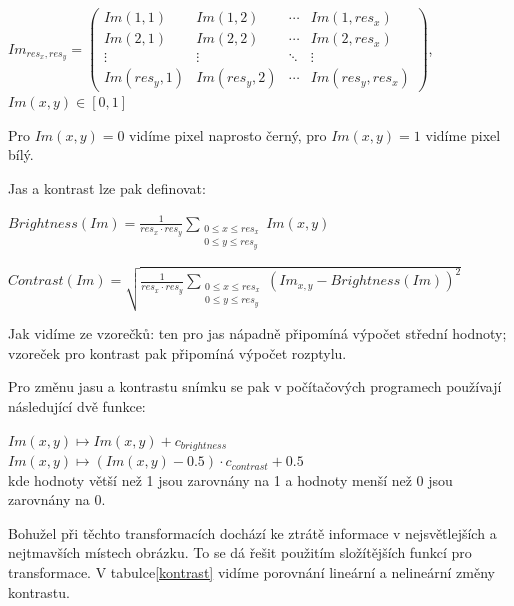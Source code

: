 $
 Im_{res_{x},res_{y}} =
 \begin{pmatrix}
  Im(1,1) & Im(1,2) & \cdots & Im(1,res_{x}) \\
  Im(2,1) & Im(2,2) & \cdots & Im(2,res_{x}) \\
  \vdots  & \vdots  & \ddots & \vdots  \\
  Im(res_{y},1) & Im(res_{y},2) & \cdots & Im(res_{y},res_{x})
 \end{pmatrix}
$, $ Im(x,y) \in [0,1] $

Pro $ Im(x,y) = 0 $ vidíme pixel naprosto černý, pro $ Im(x,y) = 1 $ vidíme pixel bílý.

Jas a kontrast lze pak definovat\cite{wikipediaContrast}:


$Brightness(Im) = \frac{1}{res_{x} \cdot res_{y}}\sum_{\substack{0 \leq x \leq res_{x} \\ 0 \leq y \leq res_{y}}} Im(x,y)$

$Contrast(Im) = \sqrt{\frac{1}{res_{x} \cdot res_{y}}\sum_{\substack{ 0 \leq x \leq res_{x} \\ 0 \leq y \leq res_{y} }}(Im_{x,y}-Brightness(Im))^2}$

Jak vidíme ze vzorečků: ten pro jas nápadně připomíná výpočet střední hodnoty; vzoreček pro kontrast pak připomíná výpočet rozptylu.

Pro změnu jasu a kontrastu snímku se pak v počítačových programech používají následující dvě funkce:

$ Im(x,y) \longmapsto Im(x,y) + c_{brightness} $ \\
\indent$ Im(x,y) \longmapsto   (Im(x,y) - 0.5) \cdot c_{contrast} + 0.5 $ \\
\indent kde hodnoty větší než 1 jsou zarovnány na 1 a hodnoty menší než 0 jsou zarovnány na 0.

Bohužel při těchto transformacích dochází ke ztrátě informace v nejsvětlejších a nejtmavších místech obrázku. To se dá řešit použitím složítějších funkcí pro transformace. V tabulce\ref{kontrast} vidíme porovnání lineární a nelineární změny kontrastu.

